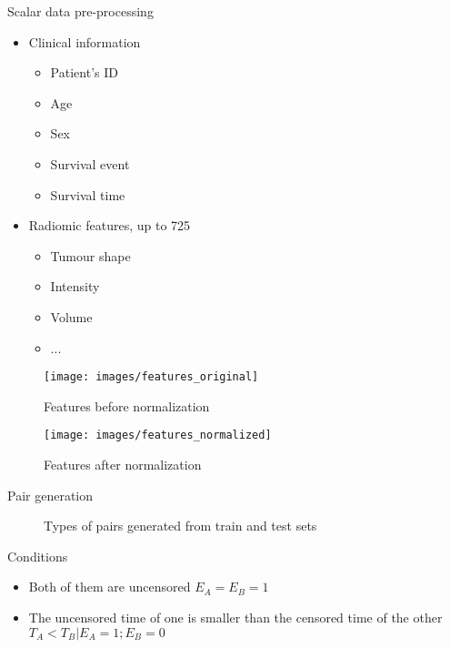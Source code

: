 \begin{frame}{Scalar data pre-processing}
  \begin{itemize}
    \item Clinical information
    \begin{itemize}
      \item Patient's ID
      \item Age
      \item Sex
      \item Survival event
      \item Survival time
    \end{itemize}
    \item Radiomic features, up to 725
    \begin{itemize}
      \item Tumour shape
      \item Intensity
      \item Volume
      \item ...
    \end{itemize}
  \end{itemize}
\end{frame}
\begin{frame}
  \begin{figure}
    \centering
    \texttt{[image: images/features\_original]}
    \caption{Features before normalization}
  \end{figure}
\end{frame}
\begin{frame}
  \begin{figure}
    \centering
    \texttt{[image: images/features\_normalized]}
    \caption{Features after normalization}
  \end{figure}
\end{frame}

\begin{frame}{Pair generation}
  
  \begin{figure}
    \centering
    \scalebox{.7}{}
    \caption{Types of pairs generated from train and test sets}
  \end{figure}

  \begin{block}{Conditions}
    \begin{itemize}
      \item Both of them are uncensored \( E_A = E_B = 1 \)
      \item The uncensored time of one is smaller than the censored time of the other
            \( T_A < T_B | E_A = 1; E_B = 0 \)
    \end{itemize}
  \end{block}
\end{frame}

